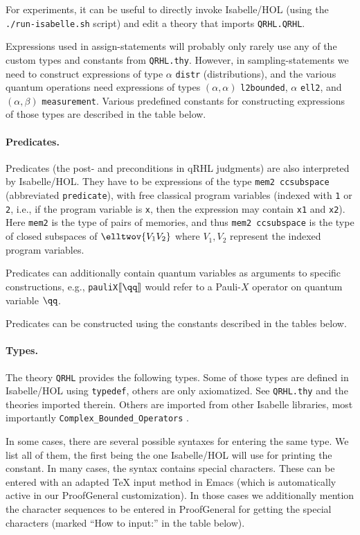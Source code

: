 \documentclass{article}
\begin{document}
For experiments, it can be useful to directly invoke Isabelle/HOL
(using the \texttt{./run-isabelle.sh} script) and edit a theory that
imports \texttt{QRHL.QRHL}.

Expressions used in assign-statements will probably only rarely use
any of the custom types and constants from \texttt{QRHL.thy}.
However, in sampling-statements we need to construct
expressions of type $\alpha$
\texttt{distr} (distributions), and the various quantum operations
need expressions of types $(\alpha,\alpha)$
\texttt{l2bounded}, $\alpha$
\texttt{ell2}, and $(\alpha,\beta)$
\texttt{measurement}. Various predefined constants for constructing
expressions of those types are described in the table below.


\paragraph{Predicates.} Predicates (the post- and preconditions in
qRHL judgments) are also interpreted by Isabelle/HOL. They have to be
expressions of the type \texttt{mem2 ccsubspace} (abbreviated \texttt{predicate}),
with free classical
program variables (indexed with \texttt{1} or \texttt{2}, i.e., if the
program variable is \texttt{x}, then the expression may contain
\texttt{x1} and \texttt{x2}). Here \texttt{mem2} is the type of pairs
of memories, and thus \texttt{mem2 ccsubspace} is the type of closed subspaces of
$\elltwov{V_1V_2}$
where $V_1,V_2$ represent the indexed program variables.

Predicates can additionally contain quantum variables as arguments to
specific constructions, e.g., \texttt{pauliX\guillemotright$\llbracket\qq\rrbracket$}
would refer to a Pauli-$X$ operator on quantum variable $\qq$.

Predicates can be constructed using the constants described in the
tables below.



\paragraph{Types.} The theory \texttt{QRHL} provides the following
types. Some of those types are defined in Isabelle/HOL using
\texttt{typedef}, others are only axiomatized.
See \texttt{QRHL.thy} and the theories imported therein.
Others are imported from other Isabelle libraries, most importantly \texttt{Complex\_Bounded\_Operators} \cite{bounded-operators}.

In some cases, there
are several possible syntaxes for entering the same type. We list
all of them, the first being the one Isabelle/HOL will use for
printing the constant. In many cases, the syntax contains special
characters. These can be entered with an adapted TeX input method in Emacs
(which is automatically active in our ProofGeneral customization). In
those cases we additionally mention the character sequences to be entered in ProofGeneral
for getting the special characters (marked ``How to input:'' in the table below).
\end{document}
